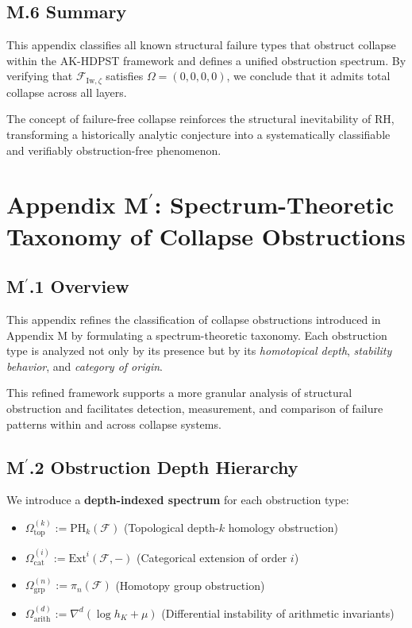 \documentclass[11pt]{article}
\begin{document}
\subsection*{M.6 Summary}

This appendix classifies all known structural failure types that obstruct collapse within the AK-HDPST framework and defines a unified obstruction spectrum. By verifying that $\mathcal{F}_{\mathrm{Iw}, \zeta}$ satisfies $\Omega = (0,0,0,0)$, we conclude that it admits total collapse across all layers.

The concept of failure-free collapse reinforces the structural inevitability of RH, transforming a historically analytic conjecture into a systematically classifiable and verifiably obstruction-free phenomenon.



\section*{Appendix M$^\prime$: Spectrum-Theoretic Taxonomy of Collapse Obstructions}

\subsection*{M$^\prime$.1 Overview}

This appendix refines the classification of collapse obstructions introduced in Appendix M by formulating a spectrum-theoretic taxonomy. Each obstruction type is analyzed not only by its presence but by its \emph{homotopical depth}, \emph{stability behavior}, and \emph{category of origin}.

This refined framework supports a more granular analysis of structural obstruction and facilitates detection, measurement, and comparison of failure patterns within and across collapse systems.

\subsection*{M$^\prime$.2 Obstruction Depth Hierarchy}

We introduce a \textbf{depth-indexed spectrum} for each obstruction type:

\begin{itemize}
    \item $\Omega_{\mathrm{top}}^{(k)} := \mathrm{PH}_k(\mathcal{F})$ \quad (Topological depth-$k$ homology obstruction)
    \item $\Omega_{\mathrm{cat}}^{(i)} := \mathrm{Ext}^i(\mathcal{F}, -)$ \quad (Categorical extension of order $i$)
    \item $\Omega_{\mathrm{grp}}^{(n)} := \pi_n(\mathcal{F})$ \quad (Homotopy group obstruction)
    \item $\Omega_{\mathrm{arith}}^{(d)} := \nabla^d(\log h_K + \mu)$ \quad (Differential instability of arithmetic invariants)
\end{itemize}
\end{document}
